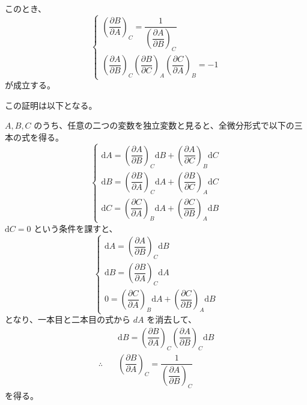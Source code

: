 \documentclass[uplatex,dvipdfmx,a4paper,11pt]{jsarticle}
\newcommand{\diff}{\mathrm d}
\newcommand{\difp}[2]{\dfrac{\partial #1}{\partial #2}}
\begin{document}
このとき、
\begin{equation*}
\begin{cases}
\left(\difp{B}{A} \right)_{C} = \dfrac{1}{ \left( \difp{A}{B} \right)_{C} } \\[12pt]
\left(\difp{A}{B} \right)_{C} \left(\difp{B}{C} \right)_{A} \left(\difp{C}{A} \right)_{B} = -1
\end{cases}
\end{equation*}
が成立する。

この証明は以下となる。

$A, B, C$ のうち、任意の二つの変数を独立変数と見ると、全微分形式で以下の三本の式を得る。
\begin{equation*}
\begin{cases}
\diff A = \left(\dfrac{\partial A}{\partial B} \right)_C \diff B + \left(\dfrac{\partial A}{\partial C} \right)_B \diff C \\[10pt]
\diff B = \left(\dfrac{\partial B}{\partial A} \right)_C \diff A + \left(\dfrac{\partial B}{\partial C} \right)_A \diff C \\[10pt]
\diff C = \left(\dfrac{\partial C}{\partial A} \right)_B \diff A + \left(\dfrac{\partial C}{\partial B} \right)_A \diff B
\end{cases}
\end{equation*}
$\diff C= 0$ という条件を課すと、
\begin{equation*}
\begin{cases}
\diff A = \left(\dfrac{\partial A}{\partial B} \right)_C \diff B \\[10pt]
\diff B = \left(\dfrac{\partial B}{\partial A} \right)_C \diff A \\[10pt]
0 = \left(\dfrac{\partial C}{\partial A} \right)_B \diff A + \left(\dfrac{\partial C}{\partial B} \right)_A \diff B
\end{cases}
\end{equation*}
となり、一本目と二本目の式から $dA$ を消去して、
\begin{align*}
&\diff B = \left(\dfrac{\partial B}{\partial A} \right)_C \left(\dfrac{\partial A}{\partial B} \right)_C \diff B \\[10pt]
\therefore \quad &\left(\dfrac{\partial B}{\partial A} \right)_{C} = \dfrac{1}{ \left( \dfrac{\partial A}{\partial B} \right)_{C} }
\end{align*}
を得る。
\end{document}
